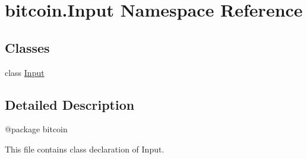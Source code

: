 \hypertarget{namespacebitcoin_1_1Input}{}\section{bitcoin.\+Input Namespace Reference}
\label{namespacebitcoin_1_1Input}
\subsection*{Classes}
\begin{DoxyCompactItemize}
\item 
class \hyperlink{classbitcoin_1_1Input_1_1Input}{Input}
\end{DoxyCompactItemize}


\subsection{Detailed Description}
\begin{DoxyVerb}@package bitcoin

This file contains class declaration of Input.
\end{DoxyVerb}
 
